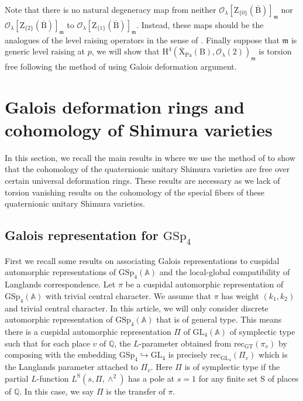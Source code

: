 \documentclass[10pt]{amsart}
\numberwithin{equation}{section}
\theoremstyle{definition}
\def\GL{\mathrm{GL}}
\def\GSp{\mathrm{GSp}}
\def\Pa{\mathrm{Pa}}
\def\calO{\mathcal{O}}
\def\fracm{\mathfrak{m}}
\def\QQ{\mathbb{Q}}
\def\rmB{\mathrm{B}}
\def\rmH{\mathrm{H}}
\def\rmS{\mathrm{S}}
\def\rmX{\mathrm{X}}
\def\rmZ{\mathrm{Z}}
\begin{document}
Note that there is no natural degeneracy map from neither $\calO_{\lambda}[\rmZ_{\{0\}}(\overline{\rmB})]_{\fracm}$ nor $\calO_{\lambda}[\rmZ_{\{2\}}(\overline{\rmB})]_{\fracm}$ to 
$\calO_{\lambda}[\rmZ_{\{1\}}(\overline{\rmB})]_{\fracm}$. Instead, these maps should be the analogues of the level raising operators in the sense of \cite{BS-newform}. Finally suppose that $\fracm$ is generic level raising at $p$, we will show that $\rmH^{4}(\overline{\rmX}_{\Pa}(\rmB), \calO_{\lambda}(2))_{\fracm}$ is torsion free following the method of \cite{LTXZZ} using Galois deformation argument.



\section{Galois deformation rings and cohomology of Shimura varieties}
In this section, we recall the main results in \cite{Wangd} where we use the method of \cite{LTXZZa} to show that the cohomology of the quaternionic unitary Shimura varieties are free over certain universal deformation rings. These results are necessary as we lack of torsion vanishing results on the cohomology of the special fibers of these quaternionic unitary Shimura varieties.

\subsection{Galois representation for $\GSp_{4}$}
First we recall some results on associating Galois representations to cuspidal automorphic representations of $\GSp_{4}(\mathbb{A})$ and the local-global compatibility of Langlands correspondence. Let $\pi$ be a cuspidal automorphic representation of $\GSp_{4}(\mathbb{A})$ with trivial central character.  We assume that $\pi$ has weight $(k_{1}, k_{2})$ and trivial central character.  In this article, we will only consider discrete automorphic representation of $\GSp_{4}(\mathbb{A})$ that is of general type. This means there is a cuspidal automorphic representation $\Pi$ of $\GL_{4}(\mathbb{A})$ of symplectic type such that for each place $v$ of $\QQ$, the $L$-parameter obtained from $\mathrm{rec}_{\mathrm{GT}}(\pi_{v})$ by composing with the embedding $\GSp_{4}\hookrightarrow\GL_{4}$ is precisely $\mathrm{rec}_{\GL_{4}}(\Pi_{v})$ which is the Langlands parameter attached to $\Pi_{v}$. Here $\Pi$ is of symplectic type if the partial $L$-function $L^{\rmS}(s, \Pi, \wedge^{2})$ has a pole at $s=1$ for any finite set $\rmS$ of places of $\QQ$. In this case, we say $\Pi$ is the transfer of $\pi$.  
\end{document}
